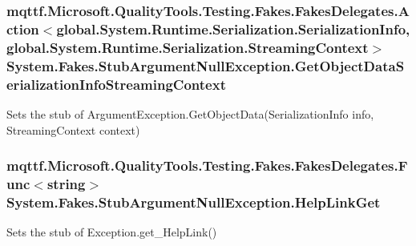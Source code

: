 \hypertarget{class_system_1_1_fakes_1_1_stub_argument_null_exception_ab2062dc65ba441ebf98f701213ed9145}{
\subsubsection[{Get\-Object\-Data\-Serialization\-Info\-Streaming\-Context}]{\setlength{\rightskip}{0pt plus 5cm}mqttf.\-Microsoft.\-Quality\-Tools.\-Testing.\-Fakes.\-Fakes\-Delegates.\-Action$<$global.\-System.\-Runtime.\-Serialization.\-Serialization\-Info, global.\-System.\-Runtime.\-Serialization.\-Streaming\-Context$>$ System.\-Fakes.\-Stub\-Argument\-Null\-Exception.\-Get\-Object\-Data\-Serialization\-Info\-Streaming\-Context}}\label{class_system_1_1_fakes_1_1_stub_argument_null_exception_ab2062dc65ba441ebf98f701213ed9145}


Sets the stub of Argument\-Exception.\-Get\-Object\-Data(\-Serialization\-Info info, Streaming\-Context context)

\hypertarget{class_system_1_1_fakes_1_1_stub_argument_null_exception_a5395a6f0f97a58e823dc0e37b9bdeb4e}{
\subsubsection[{Help\-Link\-Get}]{\setlength{\rightskip}{0pt plus 5cm}mqttf.\-Microsoft.\-Quality\-Tools.\-Testing.\-Fakes.\-Fakes\-Delegates.\-Func$<$string$>$ System.\-Fakes.\-Stub\-Argument\-Null\-Exception.\-Help\-Link\-Get}}\label{class_system_1_1_fakes_1_1_stub_argument_null_exception_a5395a6f0f97a58e823dc0e37b9bdeb4e}


Sets the stub of Exception.\-get\-\_\-\-Help\-Link()

